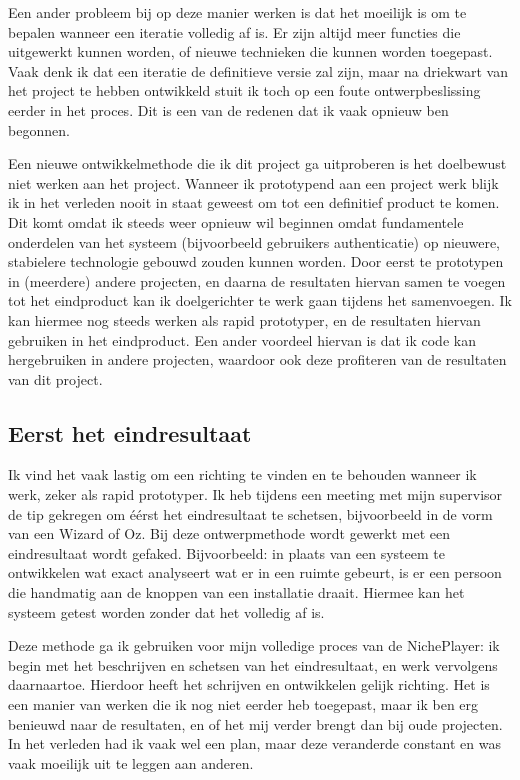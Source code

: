 Een ander probleem bij op deze manier werken is dat het moeilijk is om te bepalen wanneer een iteratie volledig af is. Er zijn altijd meer functies die uitgewerkt kunnen worden, of nieuwe technieken die kunnen worden toegepast. Vaak denk ik dat een iteratie de definitieve versie zal zijn, maar na driekwart van het project te hebben ontwikkeld stuit ik toch op een foute ontwerpbeslissing eerder in het proces. Dit is een van de redenen dat ik vaak opnieuw ben begonnen.

Een nieuwe ontwikkelmethode die ik dit project ga uitproberen is het doelbewust niet werken aan het project. Wanneer ik prototypend aan een project werk blijk ik in het verleden nooit in staat geweest om tot een definitief product te komen. Dit komt omdat ik steeds weer opnieuw wil beginnen omdat fundamentele onderdelen van het systeem (bijvoorbeeld gebruikers authenticatie) op nieuwere, stabielere technologie gebouwd zouden kunnen worden. Door eerst te prototypen in (meerdere) andere projecten, en daarna de resultaten hiervan samen te voegen tot het eindproduct kan ik doelgerichter te werk gaan tijdens het samenvoegen. Ik kan hiermee nog steeds werken als rapid prototyper, en de resultaten hiervan gebruiken in het eindproduct. Een ander voordeel hiervan is dat ik code kan hergebruiken in andere projecten, waardoor ook deze profiteren van de resultaten van dit project.

\subsection{Eerst het eindresultaat}
Ik vind het vaak lastig om een richting te vinden en te behouden wanneer ik werk, zeker als rapid prototyper. Ik heb tijdens een meeting met mijn supervisor de tip gekregen om éérst het eindresultaat te schetsen, bijvoorbeeld in de vorm van een Wizard of Oz. Bij deze ontwerpmethode wordt gewerkt met een eindresultaat wordt gefaked. Bijvoorbeeld: in plaats van een systeem te ontwikkelen wat exact analyseert wat er in een ruimte gebeurt, is er een persoon die handmatig aan de knoppen van een installatie draait. Hiermee kan het systeem getest worden zonder dat het volledig af is.

Deze methode ga ik gebruiken voor mijn volledige proces van de NichePlayer: ik begin met het beschrijven en schetsen van het eindresultaat, en werk vervolgens daarnaartoe. Hierdoor heeft het schrijven en ontwikkelen gelijk richting. Het is een manier van werken die ik nog niet eerder heb toegepast, maar ik ben erg benieuwd naar de resultaten, en of het mij verder brengt dan bij oude projecten. In het verleden had ik vaak wel een plan, maar deze veranderde constant en was vaak moeilijk uit te leggen aan anderen.

